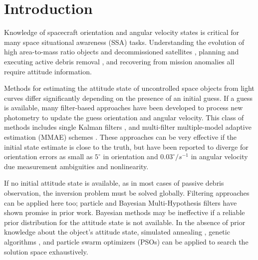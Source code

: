 \documentclass[a4paper,twocolumn]{spaceDebrisC} %
\begin{document}
\section{Introduction}

Knowledge of spacecraft orientation and angular velocity states is critical for many space situational awareness (SSA) tasks. Understanding the evolution of high area-to-mass ratio objects \cite{frueh2014} and decommissioned satellites \cite{rachman2023}, planning and executing active debris removal \cite{bonnal2013}, and recovering from mission anomalies \cite{umansky2023} all require attitude information. 

Methods for estimating the attitude state of uncontrolled space objects from light curves differ significantly depending on the presence of an initial guess. If a guess is available, many filter-based approaches have been developed to process new photometry to update the guess orientation and angular velocity. This class of methods includes single Kalman filters \cite{burton2021two, gagnon2024, wetterer2009}, and multi-filter multiple-model adaptive estimation (MMAE) schemes \cite{linares2014space, dianetti2020}. These approaches can be very effective if the initial state estimate is close to the truth, but have been reported to diverge for orientation errors as small as $5^\circ$ in orientation and $0.03^\circ/s^{-1}$ in angular velocity \cite{gagnon2024} due measurement ambiguities and nonlinearity.

If no initial attitude state is available, as in most cases of passive debris observation, the inversion problem must be solved globally. Filtering approaches can be applied here too; particle \cite{linares2014particle, holzinger2014} and Bayesian Multi-Hypothesis filters \cite{burton2021two, cabrera2023} have shown promise in prior work. Bayesian methods may be ineffective if a reliable prior distribution for the attitude state is not available. In the absence of prior knowledge about the object's attitude state, simulated annealing \cite{gagnon2024, clark2020}, genetic algorithms \cite{gagnon2024, piergentili2017, clark2020}, and particle swarm optimizers (PSOs) \cite{clark2020, clark2022, burton2024journal, burton2024scitech, gagnon2024} can be applied to search the solution space exhaustively.
\end{document}
